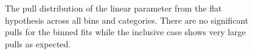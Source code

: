 \begin{figure}[h!]
  \centering
  ~~
  \\
  ~~
  \\
  \caption{\label{fig:frenchFlagPulls} The pull distribution of the linear parameter from the flat hypothesis across all
  \scalht bins and categories. There are no significant pulls for the \scalht binned
  fits while the \scalht inclusive case shows very large pulls as expected.}
\end{figure}


